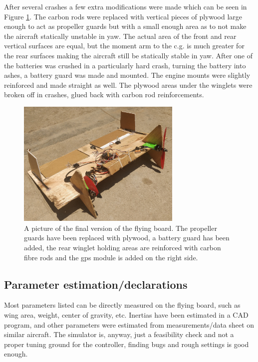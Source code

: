 \documentclass{article}
\begin{document}
After several crashes a few extra modifications were made which can be seen in Figure \ref{fig:finalboard}.
The carbon rods were replaced with vertical pieces of plywood large enough to act as propeller guards but with a small enough area as to not make the aircraft statically unstable in yaw.
The actual area of the front and rear vertical surfaces are equal, but the moment arm to the c.g. is much greater for the rear surfaces making the aircraft still be statically stable in yaw.
After one of the batteries was crushed in a particularly hard crash, turning the battery into ashes, a battery guard was made and mounted.
The engine mounts were slightly reinforced and made straight as well.
The plywood areas under the winglets were broken off in crashes, glued back with carbon rod reinforcements.

\begin{figure}
    \center
    \includegraphics[width=0.7\textwidth]{plywoodfinal.jpg}
    \caption{A picture of the final version of the flying board. The propeller guards have been replaced with plywood, a battery guard has been added, the rear winglet holding areas are reinforced with carbon fibre rods and the gps module is added on the right side.}
    \label{fig:finalboard}
\end{figure}


\subsection{Parameter estimation/declarations}
Most parameters listed can be directly measured on the flying board, such as wing area, weight, center of gravity, etc.
Inertias have been estimated in a CAD program, and other parameters were estimated from measurements/data sheet on similar aircraft.
The simulator is, anyway, just a feasibility check and not a proper tuning ground for the controller, finding bugs and rough settings is good enough.
\end{document}

